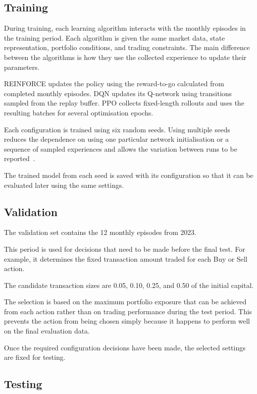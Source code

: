 \subsection{Training}

During training, each learning algorithm interacts with the monthly
episodes in the training period. Each algorithm is given the same market
data, state representation, portfolio conditions, and trading
constraints. The main difference between the algorithms is how they use
the collected experience to update their parameters.

REINFORCE updates the policy using the reward-to-go calculated from
completed monthly episodes. DQN updates its Q-network using transitions
sampled from the replay buffer. PPO collects fixed-length rollouts and
uses the resulting batches for several optimisation epochs.

Each configuration is trained using six random seeds. Using multiple
seeds reduces the dependence on using one particular network
initialisation or a sequence of sampled experiences and allows the variation between runs to be reported~\cite{henderson2018}.

The trained model from each seed is saved with its configuration so that
it can be evaluated later using the same settings.

\subsection{Validation}

The validation set contains the 12 monthly episodes from 2023.

This period is used for decisions that need to be made before the final
test. For example, it determines the fixed transaction amount traded for
each Buy or Sell action.

The candidate transaction sizes are 0.05, 0.10, 0.25, and 0.50 of the
initial capital.

The selection is based on the maximum portfolio exposure that can be
achieved from each action rather than on trading performance during the
test period. This prevents the action from being chosen simply because
it happens to perform well on the final evaluation data.

Once the required configuration decisions have been made, the selected
settings are fixed for testing.

\subsection{Testing}


